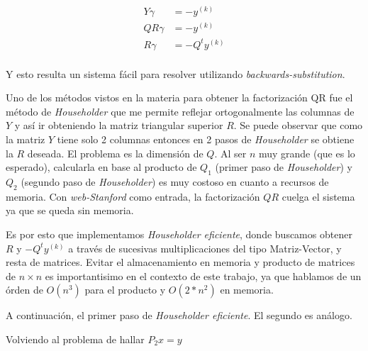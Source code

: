 \begin{align*}
	Y\gamma &=-y^{(k)}\\
	QR\gamma &=-y^{(k)}\\
	R\gamma &=-Q^{t}y^{(k)}\\
\end{align*}

Y esto resulta un sistema f\'acil para resolver utilizando \emph{backwards-substitution}.

Uno de los m\'etodos vistos en la materia para obtener la factorizaci\'on QR fue el m\'etodo de \emph{Householder} \cite{Burden} que me permite reflejar ortogonalmente las columnas de $Y$ y as\'i ir obteniendo la matriz triangular superior $R$. Se puede observar que como la matriz $Y$ tiene solo 2 columnas entonces en 2 pasos de \emph{Householder} se obtiene la $R$ deseada. El problema es la dimensi\'on de $Q$. Al ser $n$ muy grande (que es lo esperado), calcularla en base al producto de $Q_1$ (primer paso de \emph{Householder}) y $Q_2$ (segundo paso de \emph{Householder}) es muy costoso en cuanto a recursos de memoria. Con \emph{web-Stanford} como entrada, la factorizaci\'on $QR$ cuelga el sistema ya que se queda sin memoria. 

Es por esto que implementamos \emph{Householder eficiente}, donde buscamos obtener $R$ y $-Q^{t}y^{(k)}$ a trav\'es de sucesivas multiplicaciones del tipo Matriz-Vector, y resta de matrices. Evitar el almacenamiento en memoria y producto de matrices de $n \times n$ es importantisimo en el contexto de este trabajo, ya que hablamos de un \'orden de $O(n^3)$ para el producto y $O(2*n^2)$ en memoria.

A continuaci\'on, el primer paso de \emph{Householder eficiente}. El segundo es an\'alogo.


Volviendo al problema de hallar $P_{2}x = y$ %
